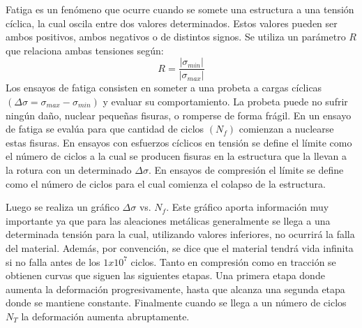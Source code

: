 \documentclass[a4paper,12pt,fleqn,twoside,openany]{book}
\begin{document}

Fatiga es un fenómeno que ocurre cuando se somete una estructura a una tensión cíclica, la cual oscila entre dos valores determinados. Estos valores 
pueden ser ambos positivos, ambos negativos o de distintos signos. Se utiliza un parámetro $R$ que relaciona ambas tensiones según:
\begin{equation}
 R=\frac{|\sigma_{min} |}{| \sigma_{max} |}
\end{equation}
Los ensayos de fatiga consisten en someter a una probeta a cargas cíclicas $(\Delta \sigma = \sigma_{max} - \sigma_{min})$ y evaluar su comportamiento. 
La probeta puede no sufrir ningún daño, nuclear pequeñas fisuras, o romperse de forma frágil. En un ensayo de fatiga se evalúa para que cantidad de 
ciclos $(N_f)$ comienzan a nuclearse estas fisuras. 
En ensayos con esfuerzos cíclicos en tensión se define el límite como el número de ciclos a la cual se producen fisuras en la estructura que la llevan a 
la rotura con un determinado $\Delta\sigma$. En ensayos de compresión el límite se define como el número de ciclos para el cual comienza el colapso 
de la estructura. 
 
Luego se realiza un gráfico $\Delta \sigma$  vs.  $N_f$. Este gráfico aporta información muy importante ya que para las aleaciones metálicas generalmente 
se llega a una determinada tensión para la cual, utilizando valores inferiores, no ocurrirá la falla del material. Además, por convención, 
se dice que el material tendrá vida infinita si no falla antes de los $1x10^7$ ciclos. Tanto en compresión como en tracción se obtienen curvas que 
siguen las siguientes etapas. Una primera etapa donde aumenta la deformación progresivamente, hasta que alcanza una segunda etapa donde se mantiene 
constante. Finalmente cuando se llega a un número de ciclos $N_T$ la deformación aumenta abruptamente. 
\end{document}
